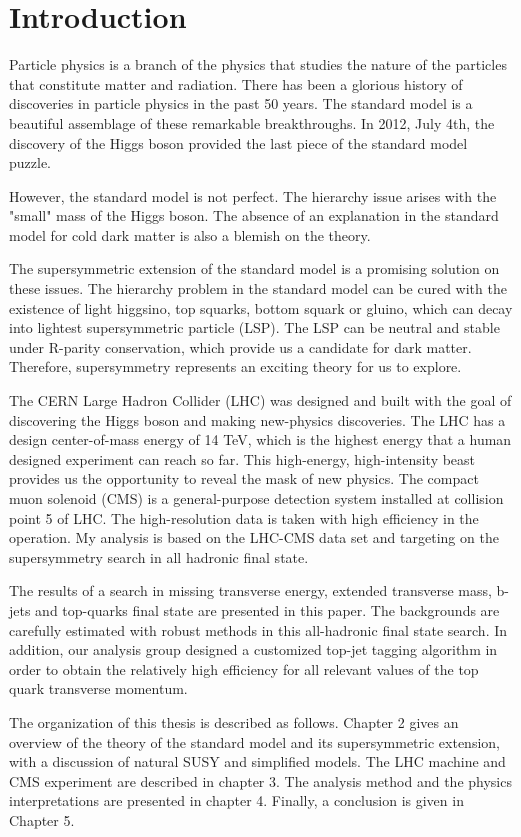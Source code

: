 \chapter{Introduction}
Particle physics is a branch of the physics that studies the nature of the particles that constitute matter and radiation. There has been a glorious history of discoveries in particle physics in the past 50 years. The standard model is a beautiful assemblage of these remarkable breakthroughs. In 2012, July 4th, the discovery of the Higgs boson provided the last piece of the standard model puzzle.

However, the standard model is not perfect. The hierarchy issue arises with the "small" mass of the Higgs boson. The absence of an explanation in the standard model for cold dark matter is also a blemish on the theory.

The supersymmetric extension of the standard model is a promising solution on these issues. The hierarchy problem in the standard model can be cured with the existence of light higgsino, top squarks, bottom squark or gluino, which can decay into lightest supersymmetric particle (LSP). The LSP can be neutral and stable under R-parity conservation, which provide us a candidate for dark matter. Therefore, supersymmetry represents an exciting theory for us to explore.

The CERN Large Hadron Collider (LHC) was designed and built with the goal of discovering the Higgs boson and making new-physics discoveries. The LHC has a design center-of-mass energy of 14 TeV, which is the highest energy that a human designed experiment can reach so far. This high-energy, high-intensity beast provides us the opportunity to reveal the mask of new physics. The compact muon solenoid (CMS) is a general-purpose detection system installed at collision point 5 of LHC. The high-resolution data is taken with high efficiency in the operation. My analysis is based on the LHC-CMS data set and targeting on the supersymmetry search in all hadronic final state.

The results of a search in missing transverse energy, extended transverse mass, b-jets and top-quarks final state are presented in this paper. The backgrounds are carefully estimated with robust methods in this all-hadronic final state search. In addition, our analysis group designed a customized top-jet tagging algorithm in order to obtain the relatively high efficiency for all relevant values of the top quark transverse momentum.

The organization of this thesis is described as follows. Chapter 2 gives an overview of the theory of the standard model and its supersymmetric extension, with a discussion of natural SUSY and simplified models. The LHC machine and CMS experiment are described in chapter 3. The analysis method and the physics interpretations are presented in chapter 4. Finally, a conclusion is given in Chapter 5.
